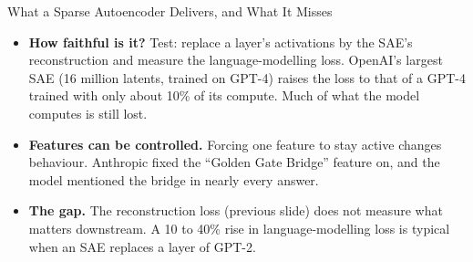 \begin{frame}{What a Sparse Autoencoder Delivers, and What It Misses}
    \begin{itemize}\itemsep0.6em
            \item \textbf{How faithful is it?} Test: replace a layer's activations by the SAE's reconstruction and measure the language-modelling loss. OpenAI's largest SAE (16 million latents, trained on GPT-4) raises the loss to that of a GPT-4 trained with only about \alert{10\% of its compute}. Much of what the model computes is still lost.
            \item \textbf{Features can be controlled.} Forcing one feature to stay active changes behaviour. Anthropic fixed the ``Golden Gate Bridge'' feature on, and the model mentioned the bridge in nearly every answer.
        \item \textbf{The gap.} The reconstruction loss (previous slide) does not measure what matters downstream. A 10 to 40\% rise in language-modelling loss is typical when an SAE replaces a layer of GPT-2.
    \end{itemize}
    \vspace{0.3em}
\end{frame}

